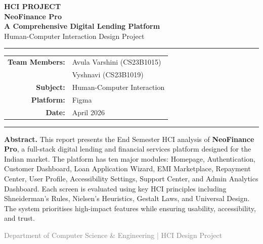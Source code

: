 \documentclass[11pt,a4paper]{article}
\begin{document}
\begin{titlepage}
\centering

  \vspace*{1.2cm}

  {\Large\bfseries\color{secdark} HCI PROJECT}\\[0.3cm]

  {\Huge\bfseries\color{secdark} NeoFinance Pro}\\[0.2cm]
  {\Large\bfseries\color{primary} A Comprehensive Digital Lending Platform}\\[0.5cm]

  {\normalsize Human-Computer Interaction Design Project}

  \vspace{0.8cm}

  \noindent\rule{\textwidth}{1.2pt}
  \vspace{0.5cm}

  \begin{tabular}{r l}
    \textbf{Team Members:} & Avula Varshini (CS23B1015) \\
                      & Vyshnavi (CS23B1019) \\[7pt]
    \textbf{Subject:}    & Human-Computer Interaction \\[7pt]
    \textbf{Platform:}  &  Figma \\[7pt]
    \textbf{Date:}       & April 2026 \\
  \end{tabular}

  \vspace{0.8cm}

  \noindent\rule{\textwidth}{1.2pt}
  \vspace{0.8cm}

  \begin{mdframed}[backgroundcolor=boxbg,linecolor=boxborder,linewidth=0.6pt]
  \small\textbf{Abstract.}
  This report presents the End Semester HCI analysis of \textbf{NeoFinance Pro}, a full-stack digital lending and financial services platform designed for the Indian market. The platform has ten major modules: Homepage, Authentication, Customer Dashboard, Loan Application Wizard, EMI Marketplace, Repayment Center, User Profile, Accessibility Settings, Support Center, and Admin Analytics Dashboard. Each screen is evaluated using key HCI principles including Shneiderman's Rules, Nielsen's Heuristics, Gestalt Laws, and Universal Design. The system prioritises high-impact features while ensuring usability, accessibility, and trust.
  \end{mdframed}

  \vfill
  {\small\textcolor{gray}{Department of Computer Science \& Engineering | HCI Design Project}}

\end{titlepage}
\tableofcontents\newpage
\end{document}
